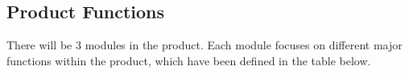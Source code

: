 \documentclass[]{article}
\begin{document}

\newpage
\subsection{Product Functions}
\label{sub:product_functions}

There will be 3 modules in the product. Each module focuses on different major functions within the product, which have been defined in the table below.
\end{document}
